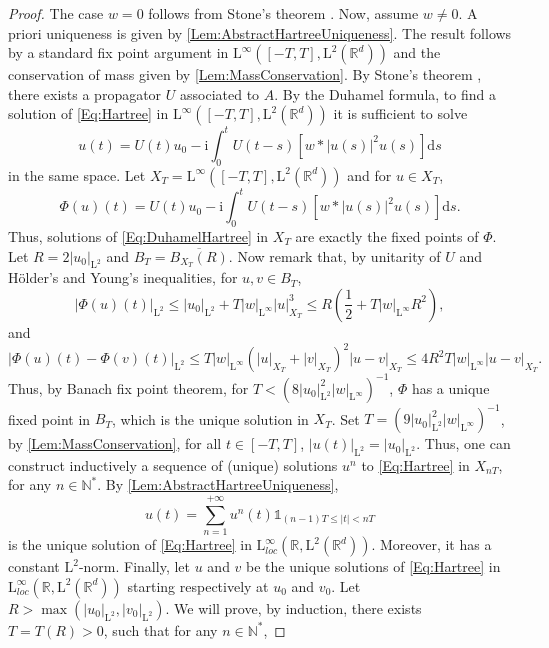 \documentclass{article}
\def\R{\mathbb R}
\def\N{\mathbb N}
\def\L{\mathrm L}
\def\d{\mathrm{d}}
\newcommand{\indic}[1]{\mathds{1}_{#1}}
\theoremstyle{definition}
\numberwithin{equation}{section}
\newcommand{\complexI}{\mathrm{i}} %
\begin{document}
\begin{proof}
    The case $w=0$ follows from Stone's theorem \cite{StoneOneParameterGroup}. Now, assume $w\neq 0$. A priori uniqueness is given by \cref{Lem:AbstractHartreeUniqueness}. The result follows by a standard fix point argument in $\L^\infty([-T,T],\L^2(\R^d))$ and the conservation of mass given by \cref{Lem:MassConservation}. By Stone's theorem \cite{StoneOneParameterGroup}, there exists a propagator $U$ associated to $A$. By the Duhamel formula, to find a solution of \cref{Eq:Hartree} in $\L^\infty([-T,T],\L^2(\R^d))$ it is sufficient to solve
    \begin{equation}\label{Eq:DuhamelHartree}
        u(t) = U(t)u_0 - \complexI\int_0^t U(t-s)\left[w*|u(s)|^2u(s)\right]\d s
    \end{equation}
    in the same space. Let $X_T = \L^\infty([-T,T],\L^2(\R^d))$ and for $u\in X_T$,
    $$\Phi(u)(t) = U(t)u_0 - \complexI\int_0^t U(t-s)\left[w*|u(s)|^2u(s)\right]\d s.$$
    Thus, solutions of \cref{Eq:DuhamelHartree} in $X_T$ are exactly the fixed points of $\Phi$. Let $R=2|u_0|_{\L^2}$ and $B_T = \overline{B_{X_T}(R)}$. Now remark that, by unitarity of $U$ and Hölder's and Young's inequalities, for $u,v\in B_T$,
    \begin{equation}
        |\Phi(u)(t)|_{\L^2}\leqslant |u_0|_{\L^2} + T|w|_{\L^\infty}|u|_{X_T}^3\leqslant R\left(\frac{1}{2}+T|w|_{\L^\infty}R^2\right),
    \end{equation}
        and
    \begin{equation}
        |\Phi(u)(t)-\Phi(v)(t)|_{\L^2}\leqslant T|w|_{\L^\infty}(|u|_{X_T}+|v|_{X_T})^2|u-v|_{X_T}\leqslant4R^2 T|w|_{\L^\infty}|u-v|_{X_T}.
    \end{equation}
    Thus, by Banach fix point theorem, for $T<(8|u_0|_{\L^2}^2|w|_{\L^\infty})^{-1}$, $\Phi$ has a unique fixed point in $B_T$, which is the unique solution in $X_T$. Set $T=(9|u_0|_{\L^2}^2|w|_{\L^\infty})^{-1}$, by \cref{Lem:MassConservation}, for all $t\in[-T,T]$, $|u(t)|_{\L^2}=|u_0|_{\L^2}$. Thus, one can construct inductively a sequence of (unique) solutions $u^n$ to \cref{Eq:Hartree} in $X_{nT}$, for any $n\in\N^*$. By \cref{Lem:AbstractHartreeUniqueness}, 
    $$u(t) = \sum_{n=1}^{+\infty} u^n(t)\indic{(n-1)T\leqslant |t|<nT} $$
    is the unique solution of \cref{Eq:Hartree} in $\L^\infty_{loc}(\R,\L^2(\R^d))$. Moreover, it has a constant $\L^2$-norm. Finally, let $u$ and $v$ be the unique solutions of \cref{Eq:Hartree} in $\L^\infty_{loc}(\R,\L^2(\R^d))$ starting respectively at $u_0$ and $v_0$. Let $R> \max(|u_0|_{\L^2},|v_0|_{\L^2})$. We will prove, by induction, there exists $T=T(R)>0$, such that for any $n\in\N^*$,

\end{proof}
\end{document}
